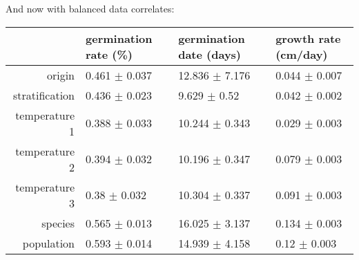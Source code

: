 \documentclass{article}
\begin{document}
And now with balanced data correlates: 
\begin{longtable}{rlll}
	\hline
	& germination rate (\%) & germination date (days) & growth rate (cm/day) \\ 
	\hline
	origin & 0.461 $\pm$ 0.037 & 12.836 $\pm$ 7.176 & 0.044 $\pm$ 0.007 \\ 
	stratification & 0.436 $\pm$ 0.023 & 9.629 $\pm$ 0.52 & 0.042 $\pm$ 0.002 \\ 
	temperature 1 & 0.388 $\pm$ 0.033 & 10.244 $\pm$ 0.343 & 0.029 $\pm$ 0.003 \\ 
	temperature 2 & 0.394 $\pm$ 0.032 & 10.196 $\pm$ 0.347 & 0.079 $\pm$ 0.003 \\ 
	temperature 3 & 0.38 $\pm$ 0.032 & 10.304 $\pm$ 0.337 & 0.091 $\pm$ 0.003 \\ 
	species & 0.565 $\pm$ 0.013 & 16.025 $\pm$ 3.137 & 0.134 $\pm$ 0.003 \\ 
	population & 0.593 $\pm$ 0.014 & 14.939 $\pm$ 4.158 & 0.12 $\pm$ 0.003 \\ 
	\hline
	\hline
\end{longtable}
\end{document}
